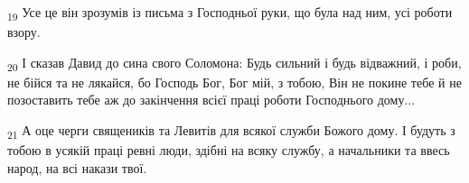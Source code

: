 \begin{tcolorbox}
\textsubscript{19} Усе це він зрозумів із письма з Господньої руки, що була над ним, усі роботи взору.
\end{tcolorbox}
\begin{tcolorbox}
\textsubscript{20} І сказав Давид до сина свого Соломона: Будь сильний і будь відважний, і роби, не бійся та не лякайся, бо Господь Бог, Бог мій, з тобою, Він не покине тебе й не позоставить тебе аж до закінчення всієї праці роботи Господнього дому...
\end{tcolorbox}
\begin{tcolorbox}
\textsubscript{21} А оце черги священиків та Левитів для всякої служби Божого дому. І будуть з тобою в усякій праці ревні люди, здібні на всяку службу, а начальники та ввесь народ, на всі накази твої.
\end{tcolorbox}
